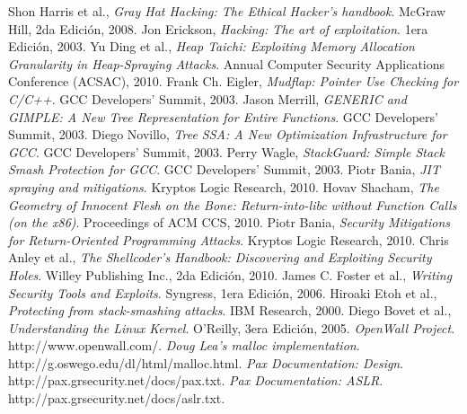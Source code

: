 \begin{thebibliography}{9}

  Shon Harris et al.,
  \emph{Gray Hat Hacking: The Ethical Hacker's handbook}.
  McGraw Hill,
  2da Edici\'on,
  2008.
  Jon Erickson,
  \emph{Hacking: The art of exploitation}.
  1era Edici\'on,
  2003.
  Yu Ding et al.,
  \emph{Heap Taichi: Exploiting Memory Allocation Granularity in Heap-Spraying Attacks}.
  Annual Computer Security Applications Conference (ACSAC),
  2010.
  Frank Ch. Eigler,
  \emph{Mudflap: Pointer Use Checking for C/C++}.
  GCC Developers' Summit,
  2003.
  Jason Merrill,
  \emph{GENERIC and GIMPLE: A New Tree Representation for Entire Functions}.
  GCC Developers' Summit,
  2003.
  Diego Novillo,
  \emph{Tree SSA: A New Optimization Infrastructure for GCC}.
  GCC Developers' Summit,
  2003.
  Perry Wagle,
  \emph{StackGuard: Simple Stack Smash Protection for GCC}.
  GCC Developers' Summit,
  2003.
  Piotr Bania,
  \emph{JIT spraying and mitigations}.
  Kryptos Logic Research,
  2010.
  Hovav Shacham,
  \emph{The Geometry of Innocent Flesh on the Bone: Return-into-libc without Function Calls (on the x86)}.
  Proceedings of ACM CCS,
  2010.
  Piotr Bania,
  \emph{Security Mitigations for Return-Oriented Programming Attacks}.
  Kryptos Logic Research,
  2010.
  Chris Anley et al.,
  \emph{The Shellcoder's Handbook: Discovering and Exploiting Security Holes}.
  Willey Publishing Inc.,
	2da Edici\'on,
  2010.
  James C. Foster et al.,
  \emph{Writing Security Tools and Exploits}.
  Syngress,
	1era Edici\'on,
  2006.
  Hiroaki Etoh et al.,
  \emph{Protecting from stack-smashing attacks}.
  IBM Research,
  2000.
  Diego Bovet et al.,
  \emph{Understanding the Linux Kernel}.
  O'Reilly,
	3era Edici\'on,
  2005.
  \emph{OpenWall Project}.
  http://www.openwall.com/.
  \emph{Doug Lea's malloc implementation}.
  http://g.oswego.edu/dl/html/malloc.html.
  \emph{Pax Documentation: Design}.
  http://pax.grsecurity.net/docs/pax.txt.
  \emph{Pax Documentation: ASLR}.
  http://pax.grsecurity.net/docs/aslr.txt.
  
\end{thebibliography}